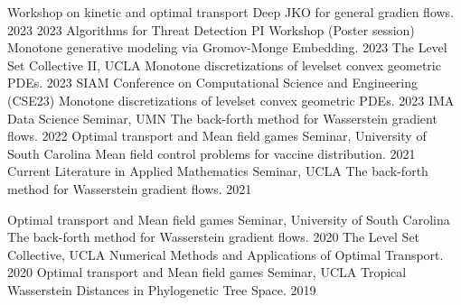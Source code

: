 


\begin{cvtalks}

\cvtalk
    {Workshop on kinetic and optimal transport} %
    {Deep JKO for general gradien flows.} %
    {2023} %
  \cvtalk
    {2023 Algorithms for Threat Detection PI Workshop (Poster session)} %
    {Monotone generative modeling via Gromov-Monge Embedding.} %
    {2023} %
  \cvtalk
    {The Level Set Collective II, UCLA} %
    {Monotone discretizations of levelset convex geometric PDEs.} %
    {2023} %
  \cvtalk
    {SIAM Conference on Computational Science and Engineering (CSE23)} %
    {Monotone discretizations of levelset convex geometric PDEs.} %
    {2023} %
  \cvtalk
    {IMA Data Science Seminar, UMN} %
    {The back-forth method for Wasserstein gradient flows.} %
    {2022} %
  \cvtalk
    {Optimal transport and Mean field games Seminar, University of South Carolina} %
    {Mean field control problems for vaccine distribution.} %
    {2021} %
  \cvtalk
    {Current Literature in Applied Mathematics Seminar, UCLA} %
    {The back-forth method for Wasserstein gradient flows.} %
    {2021} %
\end{cvtalks}

\vspace{-4mm}

\begin{cvtalks}

  \cvtalk
    {Optimal transport and Mean field games Seminar, University of South Carolina} %
    {The back-forth method for Wasserstein gradient flows.} %
    {2020} %
  \cvtalk
    {The Level Set Collective, UCLA} %
    {Numerical Methods and Applications of Optimal Transport.} %
    {2020} %
  \cvtalk
    {Optimal transport and Mean field games Seminar, UCLA} %
    {Tropical Wasserstein Distances in Phylogenetic Tree Space.} %
    {2019} %
    
\end{cvtalks}

